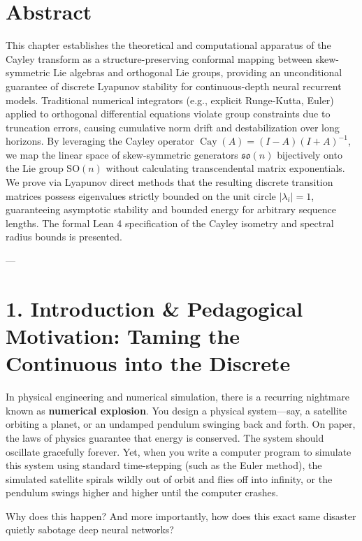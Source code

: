 \documentclass[11pt,twoside,openright]{amsbook}
\begin{document}
{{{{{{\section{Abstract}
This chapter establishes the theoretical and computational apparatus of the Cayley transform as a structure-preserving conformal mapping between skew-symmetric Lie algebras and orthogonal Lie groups, providing an unconditional guarantee of discrete Lyapunov stability for continuous-depth neural recurrent models. Traditional numerical integrators (e.g., explicit Runge-Kutta, Euler) applied to orthogonal differential equations violate group constraints due to truncation errors, causing cumulative norm drift and destabilization over long horizons. By leveraging the Cayley operator $\operatorname{Cay}(A) = (I - A)(I + A)^{-1}$, we map the linear space of skew-symmetric generators $\mathfrak{so}(n)$ bijectively onto the Lie group $\mathrm{SO}(n)$ without calculating transcendental matrix exponentials. We prove via Lyapunov direct methods that the resulting discrete transition matrices possess eigenvalues strictly bounded on the unit circle $|\lambda_i| = 1$, guaranteeing asymptotic stability and bounded energy for arbitrary sequence lengths. The formal Lean 4 specification of the Cayley isometry and spectral radius bounds is presented.

---

\section{1. Introduction & Pedagogical Motivation: Taming the Continuous into the Discrete}

In physical engineering and numerical simulation, there is a recurring nightmare known as \textbf{numerical explosion}. You design a physical system—say, a satellite orbiting a planet, or an undamped pendulum swinging back and forth. On paper, the laws of physics guarantee that energy is conserved. The system should oscillate gracefully forever.
Yet, when you write a computer program to simulate this system using standard time-stepping (such as the Euler method), the simulated satellite spirals wildly out of orbit and flies off into infinity, or the pendulum swings higher and higher until the computer crashes.

Why does this happen? And more importantly, how does this exact same disaster quietly sabotage deep neural networks?

}}}}}}
\end{document}

